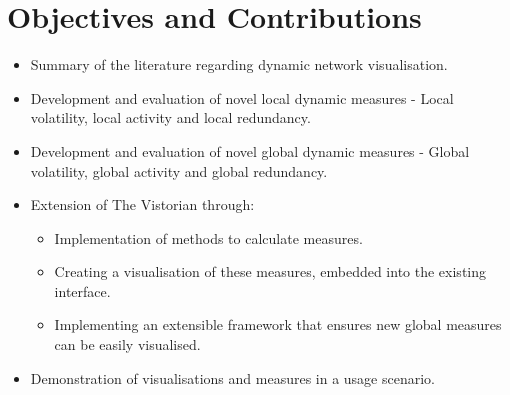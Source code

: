 \section{Objectives and Contributions}
\label{objectives}
\begin{itemize}
    \item Summary of the literature regarding dynamic network visualisation.
    \item Development and evaluation of novel local dynamic measures - Local volatility, local activity and local redundancy.
    \item Development and evaluation of novel global dynamic measures - Global volatility, global activity and global redundancy.
    \item Extension of The Vistorian through:
    \begin{itemize}
        \item Implementation of methods to calculate measures.
        \item Creating a visualisation of these measures, embedded into the existing interface.
        \item Implementing an extensible framework that ensures new global measures can be easily visualised.
    \end{itemize}
    \item Demonstration of visualisations and measures in a usage scenario.


\end{itemize}





